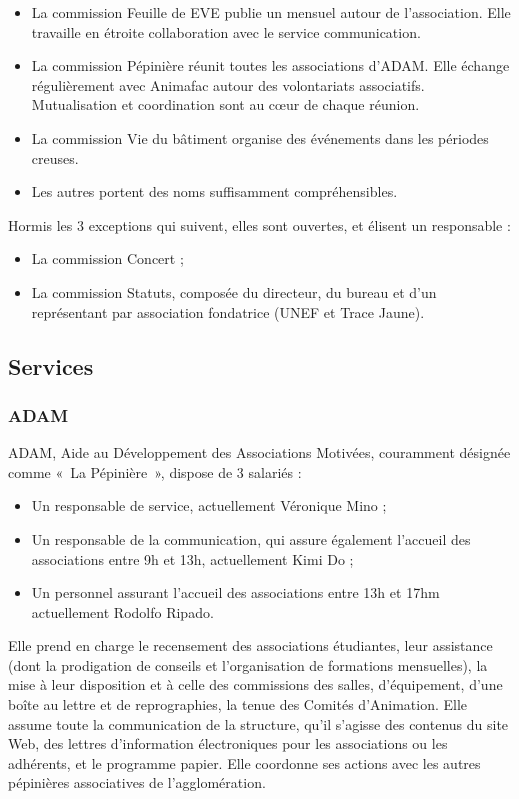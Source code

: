 \begin{itemize}
\item La commission Feuille de EVE publie un mensuel autour de l'association. Elle travaille
      en étroite collaboration avec le service communication.
\item La commission Pépinière réunit toutes les associations d'ADAM. Elle échange
      régulièrement avec Animafac autour des volontariats associatifs. Mutualisation
      et coordination sont au cœur de chaque réunion.
\item La commission Vie du bâtiment organise des événements dans les périodes creuses.
\item Les autres portent des noms suffisamment compréhensibles.
\end{itemize}

Hormis les 3 exceptions qui suivent, elles sont ouvertes,
et élisent un responsable :

\begin{itemize}
 \item La commission Concert ;
 \item La commission Statuts, composée du directeur, du bureau et d'un représentant par
       association fondatrice (UNEF et Trace Jaune).
\end{itemize}


\subsection{Services}

\subsubsection{ADAM}

ADAM, Aide au Développement des Associations Motivées, couramment désignée
comme «~La Pépinière~», dispose de 3 salariés :
\begin{itemize}
\item Un responsable de service, actuellement Véronique Mino ;
\item Un responsable de la communication, qui assure également l'accueil
      des associations entre 9h et 13h, actuellement Kimi Do ;
\item Un personnel assurant l'accueil des associations entre 13h et 17hm
      actuellement Rodolfo Ripado.
\end{itemize}

Elle prend en charge le recensement des associations étudiantes, leur assistance
(dont la prodigation de conseils et l'organisation de formations mensuelles),
la mise à leur disposition et à celle des commissions des salles, d'équipement,
d'une boîte au lettre et de reprographies, la tenue des Comités d'Animation.
Elle assume toute la communication de la structure, qu'il s'agisse des contenus
du site Web, des lettres d'information électroniques pour les associations ou
les adhérents, et le programme papier.
Elle coordonne ses actions avec les autres pépinières associatives de
l'agglomération.

